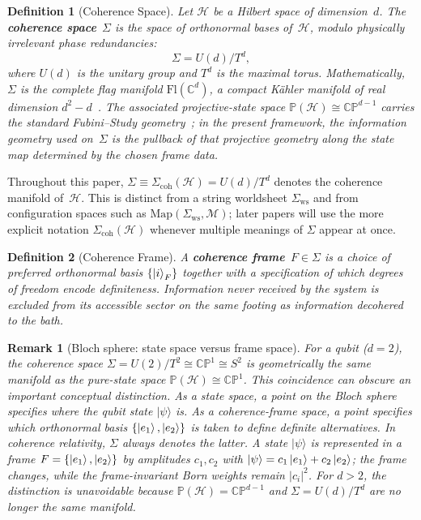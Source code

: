 \documentclass[aps,prd,twocolumn,superscriptaddress,nofootinbib,floatfix]{revtex4-2}
\newtheorem{definition}{Definition}
\newtheorem{remark}{Remark}
\newcommand{\Sig}{\Sigma}
\begin{document}
\begin{definition}[Coherence Space]
Let $\mathcal{H}$ be a Hilbert space of dimension~$d$. The \textbf{coherence space}~$\Sig$ is the space of orthonormal bases of~$\mathcal{H}$, modulo physically irrelevant phase redundancies:
\begin{equation}\label{eq:sigma}
\Sig = U(d) / T^d,
\end{equation}
where $U(d)$ is the unitary group and $T^d$ is the maximal torus. Mathematically, $\Sig$ is the \emph{complete flag manifold} $\mathrm{Fl}(\mathbb{C}^d)$, a compact K\"ahler manifold of real dimension $d^2 - d$~\cite{bengtssonGeometryQuantumStates2017,brodyGeometricQuantumMechanics2001}. The associated projective-state space $\mathbb{P}(\mathcal{H}) \cong \mathbb{CP}^{d-1}$ carries the standard Fubini--Study geometry~\cite{bengtssonGeometryQuantumStates2017,brodyGeometricQuantumMechanics2001,Kibble1979,AshtekarSchilling1997}; in the present framework, the information geometry used on~$\Sig$ is the pullback of that projective geometry along the state map determined by the chosen frame data.
\end{definition}

Throughout this paper, $\Sig \equiv \Sigma_{\mathrm{coh}}(\mathcal{H}) = U(d)/T^d$ denotes the coherence manifold of~$\mathcal{H}$. This is distinct from a string worldsheet $\Sigma_{\mathrm{ws}}$ and from configuration spaces such as $\mathrm{Map}(\Sigma_{\mathrm{ws}},\mathcal{M})$; later papers will use the more explicit notation $\Sigma_{\mathrm{coh}}(\mathcal{H})$ whenever multiple meanings of $\Sigma$ appear at once.

\begin{definition}[Coherence Frame]
A \textbf{coherence frame}~$F \in \Sig$ is a choice of preferred orthonormal basis $\{\ket{i}_F\}$ together with a specification of which degrees of freedom encode definiteness. Information never received by the system is excluded from its accessible sector on the same footing as information decohered to the bath.
\end{definition}

\begin{remark}[Bloch sphere: state space versus frame space]\label{rem:bloch-two-roles}
For a qubit ($d=2$), the coherence space $\Sig = U(2)/T^2 \cong \mathbb{CP}^1 \cong S^2$ is geometrically the same manifold as the pure-state space $\mathbb{P}(\mathcal{H}) \cong \mathbb{CP}^1$. This coincidence can obscure an important conceptual distinction. As a state space, a point on the Bloch sphere specifies where the qubit state $|\psi\rangle$ is. As a coherence-frame space, a point specifies which orthonormal basis $\{\ket{e_1},\ket{e_2}\}$ is taken to define definite alternatives. In coherence relativity, $\Sig$ always denotes the latter. A state $|\psi\rangle$ is represented \emph{in} a frame $F=\{\ket{e_1},\ket{e_2}\}$ by amplitudes $c_1,c_2$ with $|\psi\rangle = c_1\ket{e_1}+c_2\ket{e_2}$; the frame changes, while the frame-invariant Born weights remain $|c_i|^2$. For $d>2$, the distinction is unavoidable because $\mathbb{P}(\mathcal{H}) = \mathbb{CP}^{d-1}$ and $\Sig = U(d)/T^d$ are no longer the same manifold.
\end{remark}
\end{document}
